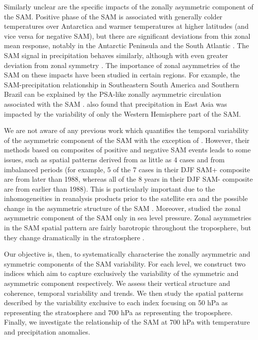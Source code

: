 \documentclass[]{ametsocV5}
\begin{document}
Similarly unclear are the specific impacts of the zonally asymmetric component of the SAM. Positive phase of the SAM is associated with generally colder temperatures over Antarctica and warmer temperatures at higher latitudes \citep{jones2019} (and vice versa for negative SAM), but there are significant deviations from this zonal mean response, notably in the Antarctic Peninsula and the South Atlantic \citep{fogt2012}. The SAM signal in precipitation behaves similarly, although with even greater deviation from zonal symmetry \citep{lim2016}. The importance of zonal asymmetries of the SAM on these impacts have been studied in certain regions. For example, the SAM-precipitation relationship in Southeastern South America and Southern Brazil can be explained by the PSA-like zonally asymmetric circulation associated with the SAM \citep{silvestri2009, rosso2018}. \citet{fan2007} also found that precipitation in East Asia was impacted by the variability of only the Western Hemisphere part of the SAM.

We are not aware of any previous work which quantifies the temporal variability of the asymmetric component of the SAM with the exception of \citet{fogt2012}. However, their methods based on composites of positive and negative SAM events leads to some issues, such as spatial patterns derived from as little as 4 cases and from imbalanced periods (for example, 5 of the 7 cases in their DJF SAM+ composite are from later than 1988, whereas all of the 8 years in their DJF SAM- composite are from earlier than 1988). This is particularly important due to the inhomogeneities in reanalysis products prior to the satellite era and the possible change in the asymmetric structure of the SAM \citep{silvestri2009}. Moreover, \citet{fogt2012} studied the zonal asymmetric component of the SAM only in sea level pressure. Zonal asymmetries in the SAM spatial pattern are fairly barotropic throughout the troposphere, but they change dramatically in the stratosphere \citep{baldwin2009}.

Our objective is, then, to systematically characterise the zonally asymmetric and symmetric components of the SAM variability. For each level, we construct two indices which aim to capture exclusively the variability of the symmetric and asymmetric component respectively. We assess their vertical structure and coherence, temporal variability and trends. We then study the spatial patterns described by the variability exclusive to each index focusing on 50 hPa as representing the stratosphere and 700 hPa as representing the troposphere. Finally, we investigate the relationship of the SAM at 700 hPa with temperature and precipitation anomalies.
\end{document}
